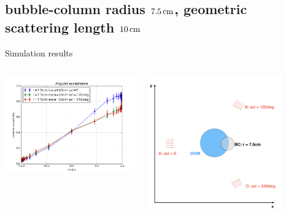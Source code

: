 \subsection{bubble-column radius $7.5\text{\,cm}$, geometric scattering length $10\text{\,cm}$}
\begin{frame}[fragile]{Simulation results}
  \begin{columns}
    \begin{column}{0.5\textwidth}
      \includegraphics[width=\textwidth]{img/summer_scenario_r7-5cm_esca10cm}
    \end{column}
    \begin{column}{0.5\textwidth}
      \includegraphics[width=0.8\textwidth]{img/summerscenario-003}
    \end{column}
  \end{columns}


\end{frame}
